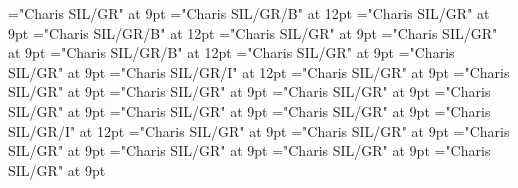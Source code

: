 \documentclass[gps1,twoside]{article}
\begin{document}
\font\configtargetsminimallexreferenceminimallexreferencessubentrysubentriesentryafter="Charis SIL/GR" at 9pt
\font\spanbzhheadwordconfigtargetconfigtargetsminimallexreferenceminimallexreferencessubentrysubentriesentry="Charis SIL/GR/B" at 12pt
\font\spanspanheadwordconfigtargetconfigtargetsminimallexreferenceminimallexreferencessubentrysubentriesentrybefore="Charis SIL/GR" at 9pt
\font\spanheadwordconfigtargetconfigtargetsminimallexreferenceminimallexreferencessubentrysubentriesentry="Charis SIL/GR/B" at 12pt
\font\spanspansensecontentspansensessubentrysubentriesentrybefore="Charis SIL/GR" at 9pt
\font\sensessubentrysubentriesentryafter="Charis SIL/GR" at 9pt
\font\sensenumbersensecontentsensessubentrysubentriesentry="Charis SIL/GR/B" at 12pt
\font\sensenumbersensecontentsensessubentrysubentriesentryafter="Charis SIL/GR" at 9pt
\font\morphosyntaxanalysissharedgrammaticalinfosensessubentrysubentriesentryafter="Charis SIL/GR" at 9pt
\font\morphosyntaxanalysissharedgrammaticalinfosensessubentrysubentriesentry="Charis SIL/GR/I" at 12pt
\font\spanspanpartofspeechmorphosyntaxanalysissharedgrammaticalinfosensessubentrysubentriesentrybefore="Charis SIL/GR" at 9pt
\font\spanpartofspeechmorphosyntaxanalysissharedgrammaticalinfosensessubentrysubentriesentrylastchildafter="Charis SIL/GR" at 9pt
\font\spanspanslotsmorphosyntaxanalysissharedgrammaticalinfosensessubentrysubentriesentrybefore="Charis SIL/GR" at 9pt
\font\slotsmorphosyntaxanalysissharedgrammaticalinfosensessubentrysubentriesentrybefore="Charis SIL/GR" at 9pt
\font\spanspannameslotslotsmorphosyntaxanalysissharedgrammaticalinfosensessubentrysubentriesentrybefore="Charis SIL/GR" at 9pt
\font\spannameslotslotsmorphosyntaxanalysissharedgrammaticalinfosensessubentrysubentriesentrylastchildafter="Charis SIL/GR" at 9pt
\font\morphosyntaxanalysissensesensessubentrysubentriesentryafter="Charis SIL/GR" at 9pt
\font\morphosyntaxanalysissensesensessubentrysubentriesentry="Charis SIL/GR/I" at 12pt
\font\spanspanpartofspeechmorphosyntaxanalysissensesensessubentrysubentriesentrybefore="Charis SIL/GR" at 9pt
\font\spanpartofspeechmorphosyntaxanalysissensesensessubentrysubentriesentrylastchildafter="Charis SIL/GR" at 9pt
\font\spanspanslotsmorphosyntaxanalysissensesensessubentrysubentriesentrybefore="Charis SIL/GR" at 9pt
\font\slotsmorphosyntaxanalysissensesensessubentrysubentriesentrybefore="Charis SIL/GR" at 9pt
\font\spanspannameslotslotsmorphosyntaxanalysissensesensessubentrysubentriesentrybefore="Charis SIL/GR" at 9pt
\font\spannameslotslotsmorphosyntaxanalysissensesensessubentrysubentriesentrylastchildafter="Charis SIL/GR" at 9pt
\end{document}
